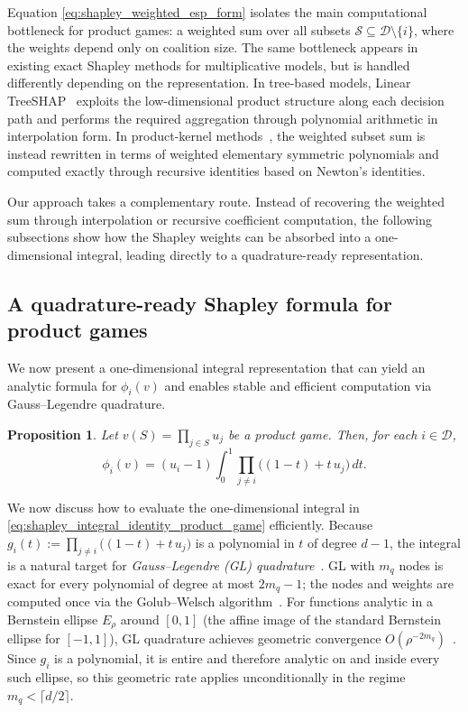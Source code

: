 \documentclass{article}
\newtheorem{proposition}{Proposition}
\newcommand{\cD}{\mathcal{D}}
\newcommand{\cS}{\mathcal{S}}
\begin{document}
Equation \cref{eq:shapley_weighted_esp_form} isolates the main computational bottleneck for product games: a weighted sum over all subsets $\cS\subseteq\cD\setminus\{i\}$, where the weights depend only on coalition size. The same bottleneck appears in existing exact Shapley methods for multiplicative models, but is handled differently depending on the representation. In tree-based models, Linear TreeSHAP~\citep{linear_treeshap, fourier_treeshap} exploits the low-dimensional product structure along each decision path and performs the required aggregation through polynomial arithmetic in interpolation form. In product-kernel methods~\citep{product_kernel_shapley}, the weighted subset sum is instead rewritten in terms of weighted elementary symmetric polynomials and computed exactly through recursive identities based on Newton's identities.

Our approach takes a complementary route. Instead of recovering the weighted sum through interpolation or recursive coefficient computation, the following subsections show how the Shapley weights can be absorbed into a one-dimensional integral, leading directly to a quadrature-ready representation.

\subsection{A quadrature-ready Shapley formula for product games}
We now present a one-dimensional integral representation that can yield an analytic formula for $\phi_i(v)$ and enables stable and efficient computation via Gauss--Legendre quadrature. 


\begin{proposition}
\label{prop:shapley_integral_identity_product_game}
Let $v(S)=\prod_{j\in S} u_j$ be a product game. Then, for each $i\in \cD$,
\begin{equation}
\label{eq:shapley_integral_identity_product_game}
\phi_i(v)
=
(u_i-1)\int_0^1 \prod_{j\neq i}\bigl((1-t)+t\,u_j\bigr)\,dt.
\end{equation}
\end{proposition}
We now discuss how to evaluate the one-dimensional integral in \cref{eq:shapley_integral_identity_product_game} efficiently.
Because $g_i(t):=\prod_{j\neq i}\bigl((1-t)+t\,u_j\bigr)$ is a polynomial in $t$ of degree $d-1$, the integral is a natural target for \emph{Gauss--Legendre (GL) quadrature}~\citep{davis1984methods}.
GL with $m_q$ nodes is exact for every polynomial of degree at most $2m_q-1$; the nodes and weights are computed once via the Golub--Welsch algorithm~\citep{golub1969calculation}.
For functions analytic in a Bernstein ellipse $E_\rho$ around $[0,1]$ (the affine image of the standard Bernstein ellipse for $[-1,1]$), GL quadrature achieves geometric convergence $O(\rho^{-2m_q})$~\citep{trefethen2008gauss}. Since $g_i$ is a polynomial, it is entire and therefore analytic on and inside every such ellipse, so this geometric rate applies unconditionally in the regime $m_q<\lceil d/2\rceil$.
\end{document}
